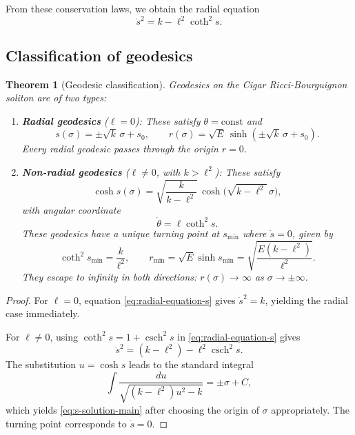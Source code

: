 \documentclass{article}
\DeclareMathOperator{\csch}{csch}
\newtheorem{theorem}{Theorem}[section]
\theoremstyle{definition}
\theoremstyle{remark}
\begin{document}
From these conservation laws, we obtain the radial equation
\begin{equation}\label{eq:radial-equation-s}
\dot{s}^2 = k - \ell^2\coth^2 s.
\end{equation}

\subsection{Classification of geodesics}

\begin{theorem}[Geodesic classification]\label{thm:geodesic-classification-main}
Geodesics on the Cigar Ricci-Bourguignon soliton are of two types:

\begin{enumerate}
\item \textbf{Radial geodesics} ($\ell=0$): These satisfy $\theta = \text{const}$ and
\[
s(\sigma) = \pm\sqrt{k}\,\sigma + s_0,
\qquad
r(\sigma) = \sqrt{E}\,\sinh(\pm\sqrt{k}\,\sigma + s_0).
\]
Every radial geodesic passes through the origin $r=0$.

\item \textbf{Non-radial geodesics} ($\ell\neq 0$, with $k>\ell^2$): These satisfy
\begin{equation}\label{eq:s-solution-main}
\cosh s(\sigma)
=
\sqrt{\frac{k}{k-\ell^2}}\,
\cosh\!\bigl(\sqrt{k-\ell^2}\,\sigma\bigr),
\end{equation}
with angular coordinate
\[
\dot{\theta} = \ell\coth^2 s.
\]
These geodesics have a unique turning point at $s_{\min}$ where $\dot{s}=0$, 
given by
\[
\coth^2 s_{\min} = \frac{k}{\ell^2}, 
\qquad
r_{\min} = \sqrt{E}\sinh s_{\min} = \sqrt{\frac{E(k-\ell^2)}{\ell^2}}.
\]
They escape to infinity in both directions: $r(\sigma) \to \infty$ as 
$\sigma \to \pm\infty$.
\end{enumerate}
\end{theorem}

\begin{proof}
For $\ell=0$, equation \eqref{eq:radial-equation-s} gives $\dot{s}^2 = k$, 
yielding the radial case immediately.

For $\ell \neq 0$, using $\coth^2 s = 1 + \csch^2 s$ in \eqref{eq:radial-equation-s} gives
\[
\dot{s}^2 = (k-\ell^2) - \ell^2 \csch^2 s.
\]
The substitution $u = \cosh s$ leads to the standard integral
\[
\int \frac{du}{\sqrt{(k-\ell^2)u^2 - k}} = \pm \sigma + C,
\]
which yields \eqref{eq:s-solution-main} after choosing the origin of $\sigma$ 
appropriately. The turning point corresponds to $\dot{s}=0$.
\end{proof}
\end{document}
